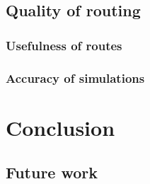 \documentclass[
	11pt,
	a4paper,
	usegeometry,
	twoside,
	openright,
	toc=chapterentrywithdots
]{scrbook}
\begin{document}
		\section{Quality of routing}
		
			\subsection{Usefulness of routes}
			
			
			\subsection{Accuracy of simulations}
		
	
	\chapter{Conclusion}
	
		\section{Future work}
		
	\printbibliography
	
	\newpage
	
\end{document}
